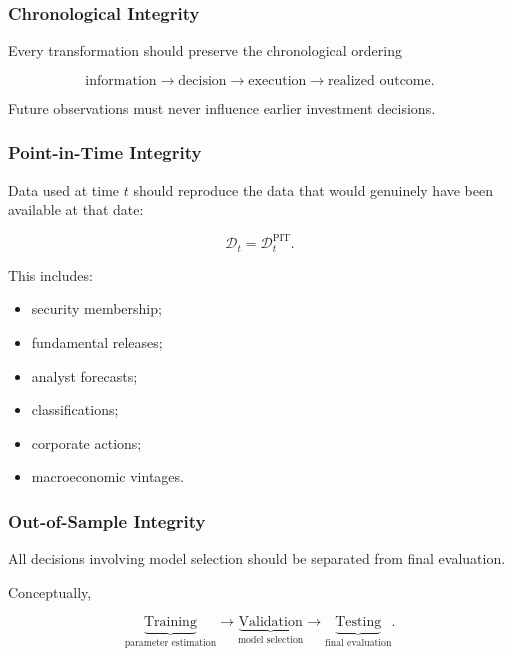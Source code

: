 \documentclass[11pt,a4paper]{article}
\begin{document}
\subsubsection{Chronological Integrity}

Every transformation should preserve the chronological ordering

\begin{equation}
\boxed{
\text{information}
\rightarrow
\text{decision}
\rightarrow
\text{execution}
\rightarrow
\text{realized outcome}.
}
\end{equation}

Future observations must never influence earlier investment decisions.


\subsubsection{Point-in-Time Integrity}

Data used at time $t$ should reproduce the data that would genuinely have been
available at that date:

\begin{equation}
\boxed{
\mathcal{D}_t
=
\mathcal{D}_t^{\mathrm{PIT}}.
}
\end{equation}

This includes:

\begin{itemize}
    \item security membership;
    \item fundamental releases;
    \item analyst forecasts;
    \item classifications;
    \item corporate actions;
    \item macroeconomic vintages.
\end{itemize}


\subsubsection{Out-of-Sample Integrity}

All decisions involving model selection should be separated from final
evaluation.

Conceptually,

\begin{equation}
\boxed{
\underbrace{\text{Training}}_{\text{parameter estimation}}
\rightarrow
\underbrace{\text{Validation}}_{\text{model selection}}
\rightarrow
\underbrace{\text{Testing}}_{\text{final evaluation}}.
}
\end{equation}
\end{document}
